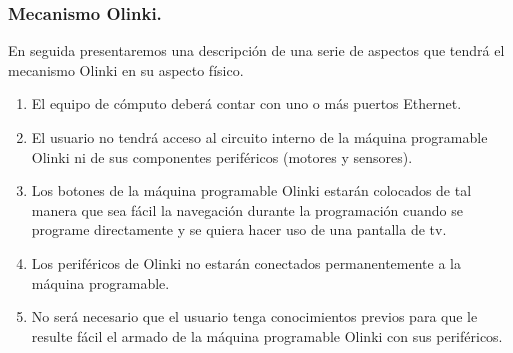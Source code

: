\documentclass[letterpaper,10pt]{article}
\begin{document}
\subsubsection{Mecanismo Olinki.}

En seguida presentaremos una descripción de una serie de aspectos que tendrá el mecanismo Olinki en su aspecto físico.
\begin{enumerate}
	\item El equipo de cómputo deberá contar con uno o más puertos Ethernet.
	\item El usuario no tendrá acceso al circuito interno de la máquina programable Olinki ni de sus componentes periféricos (motores y sensores).
	\item Los botones de la máquina programable Olinki  estarán colocados de tal manera que sea fácil la navegación durante la programación cuando se programe directamente 
	y se quiera hacer uso de una pantalla de tv.
	\item Los periféricos de Olinki no estarán conectados permanentemente a  la máquina programable.
	\item No será necesario que el usuario tenga conocimientos previos para que le resulte fácil el armado de la máquina programable Olinki  con sus periféricos.
\end{enumerate}
\end{document}
